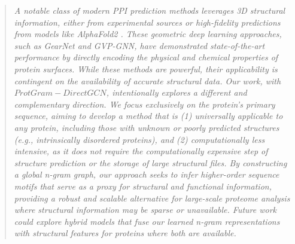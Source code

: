 \documentclass[11pt, a4paper]{article}
\begin{document}
\begin{enumerate}[label=\arabic*., leftmargin=*]
		\begin{quote}
			\textit{A notable class of modern PPI prediction methods leverages 3D structural information, either from experimental sources or high-fidelity predictions from models like AlphaFold2 \cite{jumper_highly_2021}. These geometric deep learning approaches, such as GearNet and GVP-GNN, have demonstrated state-of-the-art performance by directly encoding the physical and chemical properties of protein surfaces. While these methods are powerful, their applicability is contingent on the availability of accurate structural data. Our work, with $ProtGram-DirectGCN$, intentionally explores a different and complementary direction. We focus exclusively on the protein's primary sequence, aiming to develop a method that is (1) universally applicable to any protein, including those with unknown or poorly predicted structures (e.g., intrinsically disordered proteins), and (2) computationally less intensive, as it does not require the computationally expensive step of structure prediction or the storage of large structural files. By constructing a global n-gram graph, our approach seeks to infer higher-order sequence motifs that serve as a proxy for structural and functional information, providing a robust and scalable alternative for large-scale proteome analysis where structural information may be sparse or unavailable. Future work could explore hybrid models that fuse our learned n-gram representations with structural features for proteins where both are available.}
		\end{quote}
		
	\end{enumerate}
	

	
\end{document}
